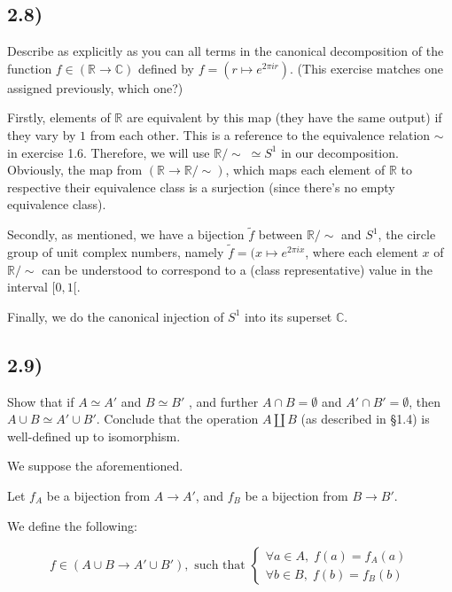 \documentclass[12pt, letterpaper, twoside]{report}
\begin{document}
\subsection*{2.8)}

Describe as explicitly as you can all terms in the canonical decomposition of the function $f \in (\mathbb{R} \to \mathbb{C})$ defined by $f = (r \mapsto e^{2 \pi i r})$. (This exercise matches one assigned previously, which one?)

Firstly, elements of $\mathbb{R}$ are equivalent by this map (they have the same output) if they vary by $1$ from each other. This is a reference to the equivalence relation $\sim$ in exercise 1.6. Therefore, we will use $\mathbb{R}/\sim \; \simeq S^1$ in our decomposition. Obviously, the map from $(\mathbb{R} \to \mathbb{R}/\sim)$, which maps each element of $\mathbb{R}$ to respective their equivalence class is a surjection (since there's no empty equivalence class).

Secondly, as mentioned, we have a bijection $\tilde{f}$ between $\mathbb{R}/\sim$ and $S^1$, the circle group of unit complex numbers, namely $\tilde{f} = (x \mapsto e^{2 \pi i x}$, where each element $x$ of $\mathbb{R}/\sim$ can be understood to correspond to a (class representative) value in the interval $[0, 1[$.

Finally, we do the canonical injection of $S^1$ into its superset $\mathbb{C}$.



\subsection*{2.9)}

Show that if $A \simeq A'$ and $B \simeq B'$ , and further $A \cap B = \emptyset$ and $A' \cap B' = \emptyset$, then $A \cup B \simeq A' \cup B'$. Conclude that the operation $A \coprod B$ (as described in §1.4) is well-defined up to isomorphism.

We suppose the aforementioned.

Let $f_A$ be a bijection from $A \to A'$, and $f_B$ be a bijection from $B \to B'$.

We define the following:

$$
f \in (A \cup B \to A' \cup B'),
\text{ such that }
\begin{cases}
	\forall a \in A, \; f(a) = f_A(a) \\
	\forall b \in B, \; f(b) = f_B(b)
\end{cases}
$$
\end{document}

